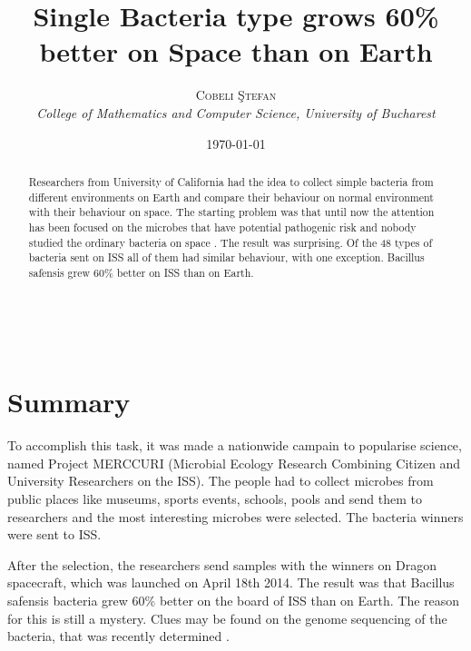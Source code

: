 \documentclass[a4paper, 11pt]{article} %
\title{\textbf{Single Bacteria type grows 60\% better on Space than on Earth}\\ %
} %
\author{\textsc{ Cobeli \c Stefan} %
\\{\textit{College of Mathematics and Computer Science, University of Bucharest }}} %
\date{\today} %
\makeatletter
\renewcommand{\maketitle}{ %
\begin{flushright} %
{\LARGE\@title} %

\vspace{50pt} %

{\large\@author} %
\\\@date %

\vspace{40pt} %
\end{flushright}
}
\makeatother
\begin{document}
\maketitle %



\begin{abstract}
 Researchers from University of California 
 had the idea to collect simple bacteria from different
 environments on Earth and compare their behaviour on normal
 environment with their behaviour on space.
 The starting problem was that until now the attention
 has been focused on the microbes that have potential
 pathogenic risk and nobody studied the ordinary bacteria on space .
The result was surprising. Of the 48 types of bacteria
 sent on ISS all of them had similar behaviour, with
 one exception. Bacillus safensis grew 60\% better on ISS than on Earth.
\end{abstract}

\hspace*{3,6mm} %

\vspace{30pt} %


\section*{Summary}

To accomplish this task, it was made a nationwide
 campain to popularise  science, named Project MERCCURI
 (Microbial Ecology Research Combining Citizen 
and University Researchers on the ISS). 
The people had to collect microbes from public places
 like museums, sports events,  schools, pools and send
 them to researchers and the most interesting microbes
 were selected. The bacteria winners were sent to ISS.
 
 
  After the selection, the researchers send
 samples with the winners on Dragon spacecraft, which was 
 launched on April 18th 2014.
The result was that Bacillus safensis bacteria grew 60\%
 better on the board of ISS than on Earth. 
 The reason for this is still a mystery. 
Clues may be found on the genome sequencing of the bacteria,
 that was recently determined .
\end{document}
